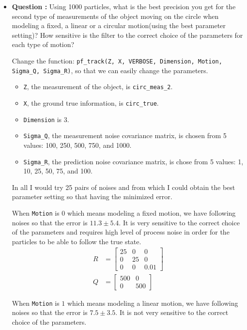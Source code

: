 \documentclass[11pt,a4paper]{article}
\begin{document}
\begin{itemize}
	\item\addtocounter{Counter}{1}\textbf{Question :} Using 1000 particles, what is the best precision you get for the second type of measurements of the object moving on the circle when modeling a fixed, a linear or a circular motion(using the best parameter setting)? How sensitive is the filter to the correct choice of the parameters for each type of motion?
		\par Change the function: \texttt{pf\_track(Z, X, VERBOSE, Dimension, Motion, Sigma\_Q, Sigma\_R)}, so that we can easily change the parameters.
		\begin{itemize}
			\item \texttt{Z}, the measurement of the object, is \texttt{circ\_meas\_2}.
			\item \texttt{X}, the ground true information, is \texttt{circ\_true}.
			\item \texttt{Dimension} is $3$.
			\item \texttt{Sigma\_Q}, the measurement noise covariance matrix, is chosen from 5 values: 100, 250, 500, 750, and 1000. 
			\item \texttt{Sigma\_R}, the prediction noise covariance matrix, is chose from 5 values: 1, 10, 25, 50, 75, and 100.
		\end{itemize}
		\par In all I would try 25 pairs of noises and from which I could obtain the best parameter setting so that having the minimized error.
		\par When \texttt{Motion} is $0$ which means modeling a fixed motion, we have following noises so that the error is $11.3 \pm 5.4$. It is very sensitive to the correct choice of the parameters and requires high level of process noise in order for the particles to be able to follow the true state.
		\begin{align*}
			R &= \begin{bmatrix} 25 & 0 & 0 \\ 0 & 25 & 0 \\ 0 & 0 & 0.01 \end{bmatrix} \\
			Q &= \begin{bmatrix} 500 & 0 \\ 0 & 500 \end{bmatrix}
		\end{align*}
		\par When \texttt{Motion} is $1$ which means modeling a linear motion, we have following noises so that the error is $7.5 \pm 3.5$. It is not very sensitive to the correct choice of the parameters.

\end{itemize}
\end{document}
